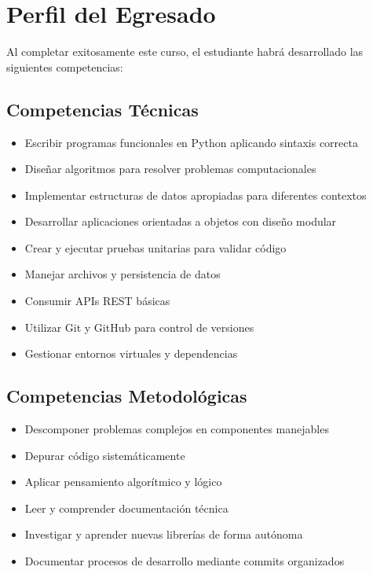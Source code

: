\documentclass[12pt,letterpaper]{article}
\begin{document}
\section{Perfil del Egresado}

Al completar exitosamente este curso, el estudiante habrá desarrollado las siguientes competencias:

\subsection{Competencias Técnicas}
\begin{itemize}[leftmargin=*]
    \item Escribir programas funcionales en Python aplicando sintaxis correcta
    \item Diseñar algoritmos para resolver problemas computacionales
    \item Implementar estructuras de datos apropiadas para diferentes contextos
    \item Desarrollar aplicaciones orientadas a objetos con diseño modular
    \item Crear y ejecutar pruebas unitarias para validar código
    \item Manejar archivos y persistencia de datos
    \item Consumir APIs REST básicas
    \item Utilizar Git y GitHub para control de versiones
    \item Gestionar entornos virtuales y dependencias
\end{itemize}

\subsection{Competencias Metodológicas}
\begin{itemize}[leftmargin=*]
    \item Descomponer problemas complejos en componentes manejables
    \item Depurar código sistemáticamente
    \item Aplicar pensamiento algorítmico y lógico
    \item Leer y comprender documentación técnica
    \item Investigar y aprender nuevas librerías de forma autónoma
    \item Documentar procesos de desarrollo mediante commits organizados
\end{itemize}
\end{document}
